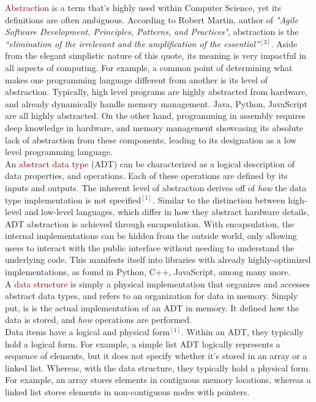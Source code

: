 \textcolor{Maroon}{Abstraction} is a term that's highly used within Computer Science, yet its definitions are often ambiguous. According to Robert Martin, author of \textit{"Agile Software Development, Principles, Patterns, and Practices"}, abstraction is the \textit{“elimination of the irrelevant and the amplification of the essential”}$^{[3]}$. Aside from the elegant simplistic nature of this quote, its meaning is very impactful in all aspects of computing. For example, a common point of determining what makes one programming language different from another is its level of abstraction. Typically, high level programs are highly abstracted from hardware, and already dynamically handle memory management. Java, Python, JavaScript are all highly abstracted. On the other hand, programming in assembly requires deep knowledge in hardware, and memory management showcasing its absolute lack of abstraction from these components, leading to its designation as a low level programming language. 
\\

An \textcolor{Maroon}{abstract data type} (ADT) can be characterized as a logical description of data properties, and operations. Each of these operations are defined by its inputs and outputs. The inherent level of abstraction derives off of \textit{how} the data type implementation is not specified$^{[1]}$. Similar to the distinction between high-level and low-level languages, which differ in how they abstract hardware details, ADT abstraction is achieved through encapsulation. With encapsulation, the internal implementations can be hidden from the outside world, only allowing users to interact with the public interface without needing to understand the underlying code. This manifests itself into libraries with already highly-optimized implementations, as found in Python, C++, JavaScript, among many more.
\\

A \textcolor{Maroon}{data structure} is simply a physical implementation that organizes and accesses abstract data types, and refers to an organization for data in memory. Simply put, is is the actual implementation of an ADT in memory. It defined how the data is stored, and \textit{how} operations are performed.
\\ 

Data items have a logical and physical form$^{[1]}$. Within an ADT, they typically hold a logical form. For example, a simple list ADT logically represents a sequence of elements, but it does not specify whether it's stored in an array or a linked list. Whereas, with the data structure, they typically hold a physical form. For example, an array stores elements in contiguous memory locations, whereas a linked list stores elements in non-contiguous nodes with pointers. 

